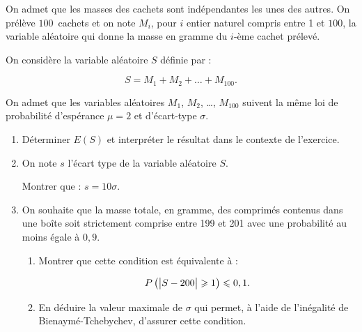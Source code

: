 \documentclass[10pt]{article}
\begin{document}
On admet que les masses des cachets sont indépendantes les unes des autres. On prélève 
$100$~cachets et on note $M_i$, pour $i$ entier naturel compris entre 1 et $100$, la variable aléatoire qui donne la masse en gramme du $i$-ème cachet prélevé.

\smallskip

On considère la variable aléatoire $S$ définie par : 

\[ S= M_1+ M_2+ \ldots+ M_{100}.\]

On admet que les variables aléatoires $M_1$,\: $M_2$,\: \ldots,\: $M_{100}$ suivent la même loi de probabilité d'espérance $\mu = 2$ et d'écart-type $\sigma$.

\begin{enumerate}
	\item Déterminer $E(S)$ et interpréter le résultat dans le contexte de l'exercice.
	\item On note $s$ l'écart type de la variable aléatoire $S$.
	
Montrer que : $s = 10\sigma$.
	\item On souhaite que la masse totale, en gramme, des comprimés contenus dans une boîte
	soit strictement comprise entre 199 et 201 avec une probabilité au moins égale à $0,9$.
	\begin{enumerate}
		\item Montrer que cette condition est équivalente à : 
		
		\[P \left ( \left |S-200 \strut \right | \geqslant 1 \right ) \leqslant 0,1.\]
		
		\item En déduire la valeur maximale de $\sigma$ qui permet, à l'aide de l'inégalité de Bienaymé­-Tchebychev, d'assurer cette condition. 
	\end{enumerate}
\end{enumerate}
\end{document}
